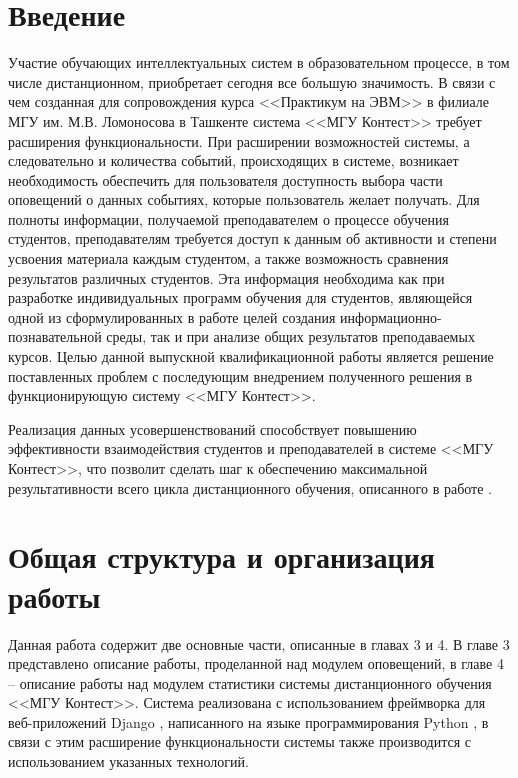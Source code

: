 \documentclass[14pt, a4paper, oneside]{extarticle}
\begin{document}
\section{Введение}
Участие обучающих интеллектуальных систем в образовательном процессе, в том числе дистанционном, приобретает сегодня все большую значимость. В связи с чем созданная для сопровождения курса <<Практикум на ЭВМ>> в филиале МГУ им. М.В. Ломоносова в Ташкенте система <<МГУ Контест>> \cite{msu-contest-site} требует расширения функциональности. При расширении возможностей системы, а следовательно и количества событий, происходящих в системе, возникает необходимость обеспечить для пользователя доступность выбора части оповещений о данных событиях, которые пользователь желает получать. Для полноты информации, получаемой преподавателем о процессе обучения студентов, преподавателям требуется доступ к данным об активности и степени усвоения материала каждым студентом, а также возможность сравнения результатов различных студентов. Эта информация необходима как при разработке индивидуальных программ обучения для студентов, являющейся одной из сформулированных в работе \cite{msu-article-1} целей создания информационно-познавательной среды, так и при анализе общих результатов преподаваемых курсов. Целью данной выпускной квалификационной работы является решение поставленных проблем с последующим внедрением полученного решения в функционирующую систему <<МГУ Контест>>.

Реализация данных усовершенствований способствует повышению эффективности взаимодействия студентов и преподавателей в системе <<МГУ Контест>>, что позволит сделать шаг к обеспечению максимальной результативности всего цикла дистанционного обучения, описанного в работе \cite{msu-article-2}.

\newpage

\section{Общая структура и организация работы}
Данная работа содержит две основные части, описанные в главах 3 и 4. В главе 3 представлено описание работы, проделанной над модулем оповещений, в главе 4 – описание работы над модулем статистики системы дистанционного обучения <<МГУ Контест>>. Система реализована с использованием фреймворка для веб-приложений Django \cite{django}, написанного на языке программирования Python \cite{python}, в связи с этим расширение функциональности системы также производится с использованием указанных технологий.
\end{document}
